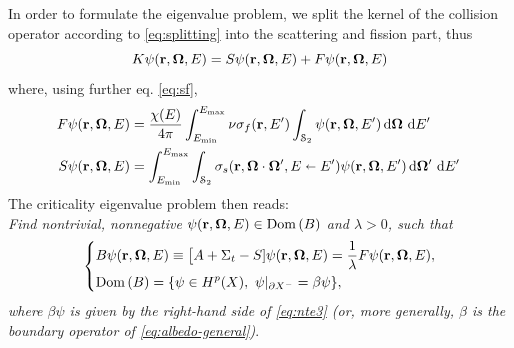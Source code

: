 In order to formulate
the eigenvalue problem, we split the kernel of the collision operator according to \eqref{eq:splitting} into the 
scattering and fission part, thus
$$
K\psi(\br,\bomega,E)
  			= S\psi(\br,\bomega,E) + F\psi(\br,\bomega,E)
$$
where, using further eq. \eqref{eq:sf},
\begin{equation}\label{eq:FScrit}
\begin{aligned}
F\psi(\br,\bomega,E) &= \frac{\chi(E)}{4\pi}\intE[']{\Emin}{\Emax}{\nu\sigma_f(\br,E')\intA{\psi(\br,\bomega,E')}}\\
S\psi(\br,\bomega,E) &= \intE[']{\Emin}{\Emax}{\intA[']{\sigma_s(\br,\bomega\cdot\bomega',E\sla
E')\psi(\br,\bomega,E')}}
\end{aligned}
\end{equation}
The criticality eigenvalue problem then reads:\\
\textit{Find nontrivial, nonnegative $\psi(\br,\bomega,E)\in \Dom{B}$ and $\lambda > 0$, such that}
\begin{equation}\label{eq:critical}
\left\{
  \begin{aligned}
     &B\psi(\br,\bomega,E) \equiv \bigl[A + \Sigma_t - S]\psi(\br,\bomega,E) = \frac{1}{\lambda} F\psi(\br,\bomega,E),\\
     &\Dom{B} = \{\psi\in \Hp(X),\ \psi\vert_{\pX[-]} = \beta\psi\},
  \end{aligned}
\right.
\end{equation}
\textit{where $\beta\psi$ is given by the right-hand side of \eqref{eq:nte3} (or, more generally, $\beta$ is the
boundary operator of \eqref{eq:albedo-general})}.  

